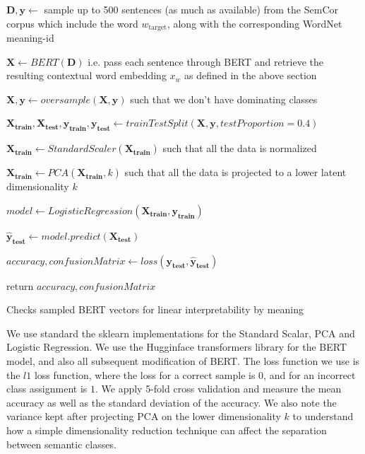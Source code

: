 \documentclass[a4paper,12pt,oneside,openright]{report}
\begin{document}
\begin{algorithm}[H]
\SetAlgoLined
{}
 $\mathbf{D}, \mathbf{y} \leftarrow $  sample up to 500 sentences (as much as available) from the SemCor corpus which include the word $w_{\text{target}}$, along with the corresponding WordNet meaning-id\;

$ \mathbf{X} \leftarrow BERT( \mathbf{D} )$ i.e. pass each sentence through BERT and retrieve the resulting contextual word embedding $x_w$ as defined in the above section\;
 
$ \mathbf{X}, \mathbf{y} \leftarrow oversample( \mathbf{X}, \mathbf{y} )$ such that we don't have dominating classes\;
 
$ \mathbf{X_\text{train}}, \mathbf{X_\text{test}}, \mathbf{y_\text{train}}, \mathbf{y_\text{test}} \leftarrow trainTestSplit( \mathbf{X}, \mathbf{y}, testProportion=0.4 )$ \;

$ \mathbf{X_\text{train}} \leftarrow StandardScaler( \mathbf{X_\text{train}})$ such that all the data is normalized\;

$ \mathbf{X_\text{train}} \leftarrow PCA( \mathbf{X_\text{train}}, k )$ such that all the data is projected to a lower latent dimensionality $k$\;

$ model \leftarrow LogisticRegression( \mathbf{X_\text{train}}, \mathbf{y_\text{train}} )$ \;
    
$ \mathbf{\hat{y}_\text{test}} \leftarrow model.predict(\mathbf{X_\text{test}})$ \;

$ accuracy, confusionMatrix \leftarrow loss(\mathbf{y_\text{test}}, \mathbf{\hat{y}_\text{test}}) $ \;
    
return $ accuracy, confusionMatrix $\;
    
 \caption{Checks sampled BERT vectors for linear interpretability by meaning}
 \label{alg:linear_separability}
\end{algorithm}

\hfill \break

We use standard the sklearn \cite{scikit-learn} implementations for the Standard Scalar, PCA and Logistic Regression. 
We use the Hugginface transformers library \cite{Wolf2019} for the  BERT model, and also all subsequent modification of BERT.
The loss function we use is the $l1$ loss function, where the loss for a correct sample is $0$, and for an incorrect class assignment is $1$.
We apply 5-fold cross validation and measure the mean accuracy as well as the standard deviation of the accuracy. 
We also note the variance kept after projecting PCA on the lower dimensionality $k$ to understand how a simple dimensionality reduction technique can affect the separation between semantic classes.
\end{document}
